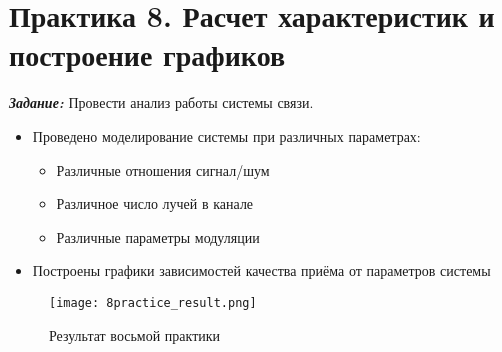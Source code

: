 \chapter*{Практика 8. Расчет характеристик и построение графиков}
\label{ch:8_practice}

\textit{\textbf{Задание:}} Провести анализ работы системы связи.

\begin{itemize}
    \item Проведено моделирование системы при различных параметрах:
    \begin{itemize}
        \item Различные отношения сигнал/шум
        \item Различное число лучей в канале
        \item Различные параметры модуляции
    \end{itemize}
    \item Построены графики зависимостей качества приёма от параметров системы
\end{itemize}

\begin{figure}[ht]
    \centering
    \texttt{[image: 8practice\_result.png]}
    \caption{Результат восьмой практики}
    \label{fig:8practice_result}
\end{figure}
